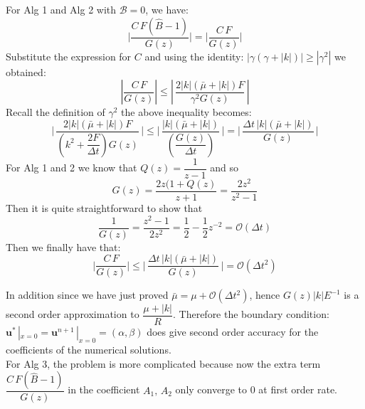 For Alg 1 and Alg 2 with $\mathcal{B} = 0$, we have:
\begin{equation*}
\vert \dfrac{C\,F(\hat{B} -1)}{G(z)}\vert = \vert \dfrac{C\,F}{G(z)}\vert
\end{equation*}
Substitute the expression for $C$ and using the identity: $| \gamma (\gamma + |k|) | \geqslant |\gamma^2|$ we obtained:
\begin{equation*}
|\dfrac{C\,F}{G(z)}| \leqslant |\,\dfrac{2|k|(\bar{\mu}+|k|)F}{\gamma^2G(z)}\,|
\end{equation*}
Recall the definition of $\gamma^2$ the above inequality becomes:
\begin{equation*}
\Biggl|\,\dfrac{2|k|(\bar{\mu}+|k|)F}{\left(k^2+ \dfrac{2F}{\Delta t}\right) G(z)}\,\Biggr| \leqslant \Biggl|\,\dfrac{|k|(\bar{\mu}+|k|)}{\left(\dfrac{G(z)}{\Delta t}\right)}\,\Biggr| = \Biggl|\,\dfrac{\Delta t \,|k|(\bar{\mu}+|k|)}{G(z)}\,\Biggr| 
\end{equation*}
For Alg 1 and 2 we know that $Q(z) = \dfrac{1}{z-1}$ and so
\begin{equation*}
G(z) = \dfrac{2z(1+Q(z)}{z+1} = \dfrac{2z^2}{z^2-1}
\end{equation*}
Then it is quite straightforward to show that 
\begin{equation*}
\dfrac{1}{G(z)} = \dfrac{z^2-1}{2z^2} = \dfrac{1}{2} - \dfrac{1}{2}z^{-2} = \mathcal{O}(\Delta t)
\end{equation*}
Then we finally have that:
\begin{equation}
\Biggl|\dfrac{C\,F}{G(z)}\Biggr| \leqslant \Biggl|\,\dfrac{\Delta t \,|k|(\bar{\mu}+|k|)}{G(z)}\,\Biggr| = \mathcal{O}(\Delta t^2)
\end{equation}

In addition since we have just proved $\bar{\mu} = \mu + \mathcal{O} (\Delta t^2)$, hence $G(z) |k|E^{-1}$ is a second order approximation to $\dfrac{\mu + |k|}{R} $. Therefore the boundary condition: $\textbf{u}^* \,|_{x=0} = \textbf{u}^{n+1}\,|_{x=0} = (\alpha,\beta)$ does give second order accuracy for the coefficients of the numerical solutions.\\

For Alg 3, the problem is more complicated because now the extra term $\dfrac{C \, F(\hat{B} - 1)}{G(z)}$ in the coefficient $A_1,\,A_2$ only converge to 0 at first order rate. \\


